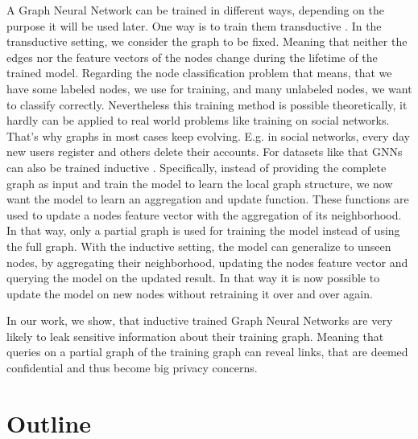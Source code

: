 		A Graph Neural Network can be trained in different ways, depending on the purpose it will be used later.
		One way is to train them transductive \cite{5206871, ZHA2010187, WANG2017218, 10.1007/978-3-642-04174-7_29}.
		In the transductive setting, we consider the graph to be fixed.
		Meaning that neither the edges nor the feature vectors of the nodes change during the lifetime of the trained model.
		Regarding the node classification problem that means, that we have some labeled nodes, we use for training, and many unlabeled nodes, we want to classify correctly.
		Nevertheless this training method is possible theoretically, it hardly can be applied to real world problems like training on social networks.
		That's why graphs in most cases keep evolving.
		E.g. in social networks, every day new users register and others delete their accounts.
		For datasets like that GNNs can also be trained inductive \cite{zeng2020graphsaint, 8519335, zhang2020document}.
		Specifically, instead of providing the complete graph as input and train the model to learn the local graph structure, we now want the model to learn an aggregation and update function.
		These functions are used to update a nodes feature vector with the aggregation of its neighborhood.
		In that way, only a partial graph is used for training the model instead of using the full graph.
		With the inductive setting, the model can generalize to unseen nodes, by aggregating their neighborhood, updating the nodes feature vector and querying the model on the updated result.
		In that way it is now possible to update the model on new nodes without retraining it over and over again.

		In our work, we show, that inductive trained Graph Neural Networks are very likely to leak sensitive information about their training graph. 
		Meaning that queries on a partial graph of the training graph can reveal links, that are deemed confidential and thus become big privacy concerns.

	\section{Outline}
